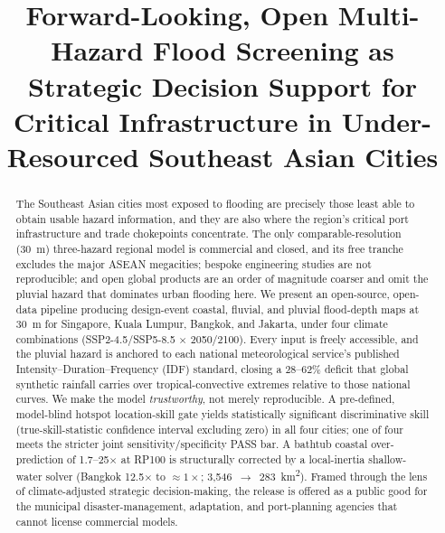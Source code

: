 \documentclass[conference]{IEEEtran}
\begin{document}
\title{Forward-Looking, Open Multi-Hazard Flood Screening as Strategic Decision Support for Critical Infrastructure in Under-Resourced Southeast Asian Cities}


\author{
\and
{}
}

\maketitle

\begin{abstract}
The Southeast Asian cities most exposed to flooding are precisely those least able to obtain usable hazard information, and they are also where the region's critical port infrastructure and trade chokepoints concentrate. The only comparable-resolution (30~m) three-hazard regional model is commercial and closed, and its free tranche excludes the major ASEAN megacities; bespoke engineering studies are not reproducible; and open global products are an order of magnitude coarser and omit the pluvial hazard that dominates urban flooding here. We present an open-source, open-data pipeline producing design-event coastal, fluvial, and pluvial flood-depth maps at 30~m for Singapore, Kuala Lumpur, Bangkok, and Jakarta, under four climate combinations (SSP2-4.5/SSP5-8.5 $\times$ 2050/2100). Every input is freely accessible, and the pluvial hazard is anchored to each national meteorological service's published Intensity--Duration--Frequency (IDF) standard, closing a 28--62\% deficit that global synthetic rainfall carries over tropical-convective extremes relative to those national curves. We make the model \emph{trustworthy}, not merely reproducible. A pre-defined, model-blind hotspot location-skill gate yields statistically significant discriminative skill (true-skill-statistic confidence interval excluding zero) in all four cities; one of four meets the stricter joint sensitivity/specificity PASS bar. A bathtub coastal over-prediction of 1.7--25$\times$ at RP100 is structurally corrected by a local-inertia shallow-water solver (Bangkok 12.5$\times$ to ${\approx}1\times$; 3{,}546~$\rightarrow$~283~km\textsuperscript{2}). Framed through the lens of climate-adjusted strategic decision-making, the release is offered as a public good for the municipal disaster-management, adaptation, and port-planning agencies that cannot license commercial models.
\end{abstract}
\end{document}
